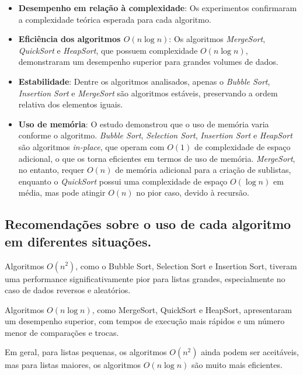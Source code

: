 \documentclass[a4paper,12pt]{article}
\begin{document}
\begin{itemize}
    \item \textbf{Desempenho em relação à complexidade}: Os experimentos confirmaram a complexidade teórica esperada para cada algoritmo. 

    \item \textbf{Eficiência dos algoritmos \( O(n \log n) \)}: Os algoritmos \textit{MergeSort}, \textit{QuickSort} e \textit{HeapSort}, que possuem complexidade \( O(n \log n) \), demonstraram um desempenho superior para grandes volumes de dados.

    \item \textbf{Estabilidade}: Dentre os algoritmos analisados, apenas o \textit{Bubble Sort}, \textit{Insertion Sort} e \textit{MergeSort} são algoritmos estáveis, preservando a ordem relativa dos elementos iguais. 

    \item \textbf{Uso de memória}: O estudo demonstrou que o uso de memória varia conforme o algoritmo. \textit{Bubble Sort}, \textit{Selection Sort}, \textit{Insertion Sort} e \textit{HeapSort} são algoritmos \textit{in-place}, que operam com \( O(1) \) de complexidade de espaço adicional, o que os torna eficientes em termos de uso de memória. \textit{MergeSort}, no entanto, requer \( O(n) \) de memória adicional para a criação de sublistas, enquanto o \textit{QuickSort} possui uma complexidade de espaço \( O(\log n) \) em média, mas pode atingir \( O(n) \) no pior caso, devido à recursão.

\end{itemize}

\subsection{Recomendações sobre o uso de cada algoritmo em diferentes situações.}
Algoritmos \( O(n^2) \), como o Bubble Sort, Selection Sort e Insertion Sort, tiveram uma performance significativamente pior para listas grandes, especialmente no caso de dados reversos e aleatórios.

Algoritmos \( O(n \log n) \), como MergeSort, QuickSort e HeapSort, apresentaram um desempenho superior, com tempos de execução mais rápidos e um número menor de comparações e trocas.

Em geral, para listas pequenas, os algoritmos \( O(n^2) \) ainda podem ser aceitáveis, mas para listas maiores, os algoritmos \( O(n \log n) \) são muito mais eficientes.
\end{document}
